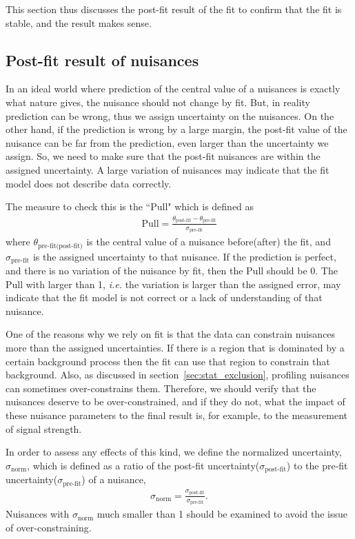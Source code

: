 This section thus discusses the post-fit result of the fit 
to confirm that the fit is stable, and the result makes sense. 

\subsection{Post-fit result of nuisances}

In an ideal world where prediction of the central value of a nuisances is 
exactly what nature gives, the nuisance should not change by fit. But, in reality 
prediction can be wrong, thus we assign uncertainty on the nuisances. On the other 
hand, if the prediction is wrong by a large margin, the post-fit value of the nuisance 
can be far from the prediction, even larger than the uncertainty we assign. 
So, we need to make sure that the post-fit nuisances are within the assigned uncertainty.
A large variation of nuisances may indicate that the fit model does not 
describe data correctly. 

The measure to check this is the ``Pull" which is defined as 
\begin{eqnarray} 
\textrm{Pull} = \frac{\theta_{\textrm{post-fit}} - \theta_{\textrm{pre-fit}}}{\sigma_{\textrm{pre-fit}}}  
\end{eqnarray} 
where $\theta_{\textrm{pre-fit(post-fit)}}$ is the central value of a nuisance 
before(after) the fit, and $\sigma_{\textrm{pre-fit}}$ is the assigned uncertainty 
to that nuisance. If the prediction is perfect, and there is no variation of 
the nuisance by fit, then the Pull should be 0. The Pull with larger than 1, 
\textit{i.e.} the variation is larger than the assigned error, may indicate 
that the fit model is not correct or a lack of understanding of that nuisance. 

One of the reasons why we rely on fit is that the data can constrain nuisances 
more than the assigned uncertainties. If there is a region that is dominated by 
a certain background process then the fit can use that region to constrain that 
background. Also, as discussed in section~\ref{sec:stat_exclusion}, profiling 
nuisances can sometimes over-constrains them. Therefore, we should verify  
that the nuisances deserve to be over-constrained, and if they do not, what the 
impact of these nuisance parameters to the final result is, for example, 
to the measurement of signal strength. 

In order to assess any effects of this kind, we define the 
normalized uncertainty, $\sigma_{\textrm{norm}}$, which is defined as a 
ratio of the post-fit uncertainty($\sigma_{\textrm{post-fit}}$) 
to the pre-fit uncertainty($\sigma_{\textrm{pre-fit}}$) of a nuisance, 
\begin{eqnarray} 
\sigma_{\textrm{norm}} = \frac{\sigma_{\textrm{post-fit}}}{\sigma_{\textrm{pre-fit}}}. 
\end{eqnarray} 
Nuisances with $\sigma_{\textrm{norm}}$ much smaller than 1 should be 
examined to avoid the issue of over-constraining. 


